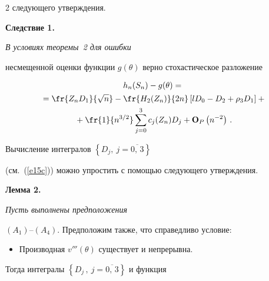 \begin{multicols}{2}
  следующего утверждения.





\medskip





\noindent


{\bf Следствие 1.} {\it В условиях теоремы~2 для ошибки


  несмещенной оценки функции $g(\theta)$ верно стохастическое разложение


\begin{multline*} 


h_n(S_n)-g(\theta)={}\\


{}=\fr{Z_nD_1}{\sqrt{n}}-


     \fr{H_2(Z_n)}{2n}\left[lD_0-D_2+\rho_3D_1\right]+{}\\


{}+


     \fr{1}{n^{3/2}} \sum_{j=0}^3 c_j(Z_n)D_j+


     {\bf O}_P\left(n^{-2}\right)\,.


\end{multline*}


   }





   \noindent


   Вычисление интегралов $\left\{D_j,~j=\overline{0,\,3} \right\}$


   (см.~(\ref{e15c})) можно упростить с помощью следующего утверждения.





\medskip





\noindent


{\bf Лемма 2.} {\it Пусть выполнены предположения


  $(A_1)$--$(A_4)$. Предположим также, что справедливо условие:


{\addtolength{\leftmargini}{10pt}


  \begin{itemize}


  \item [\sffamily $(A_6).$] Производная $v'''(\theta)$ существует и непрерывна.


  \end{itemize}}


   Тогда интегралы $\left\{D_j\,,~j=\overline{0,\,3} \right\}$ и функция


}
\end{multicols}
